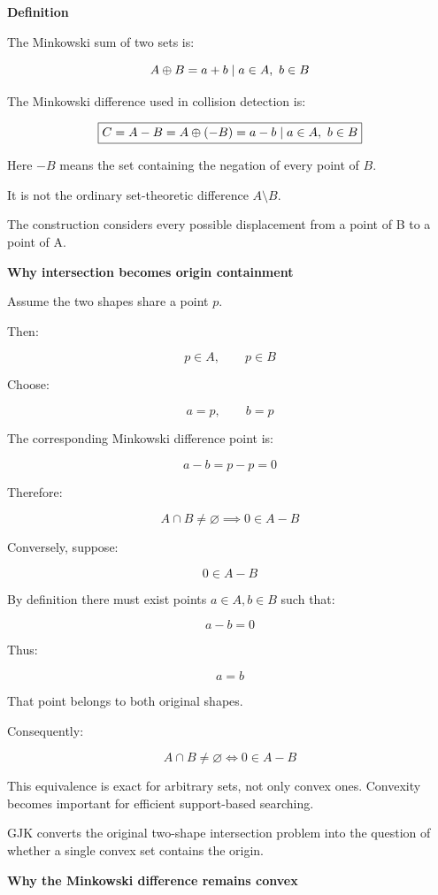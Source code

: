 \textbf{Definition}

The Minkowski sum of two sets is:

\[
A\oplus B=\\{a+b\mid a\in A,\ b\in B\\}
\]

The Minkowski difference used in collision detection is:

\[
\boxed{ C=A-B=A\oplus(-B)=\\{a-b\mid a\in A,\ b\in B\\} }
\]

Here \(-B\) means the set containing the negation of every point of \(B\).

It is not the ordinary set-theoretic difference \(A\setminus B\).

The construction considers every possible displacement from a point of B to a point of A.

\textbf{Why intersection becomes origin containment}

Assume the two shapes share a point \(p\).

Then:

\[
p\in A,\qquad p\in B
\]

Choose:

\[
a=p,\qquad b=p
\]

The corresponding Minkowski difference point is:

\[
a-b=p-p=0
\]

Therefore:

\[
A\cap B\ne\varnothing \implies 0\in A-B
\]

Conversely, suppose:

\[
0\in A-B
\]

By definition there must exist points \(a\in A,b\in B\) such that:

\[
a-b=0
\]

Thus:

\[
a=b
\]

That point belongs to both original shapes.

Consequently:

\[
\boxed{ A\cap B\ne\varnothing \iff 0\in A-B }
\]

This equivalence is exact for arbitrary sets, not only convex ones. Convexity becomes important for efficient support-based searching.

GJK converts the original two-shape intersection problem into the question of whether a single convex set contains the origin.

\textbf{Why the Minkowski difference remains convex}

